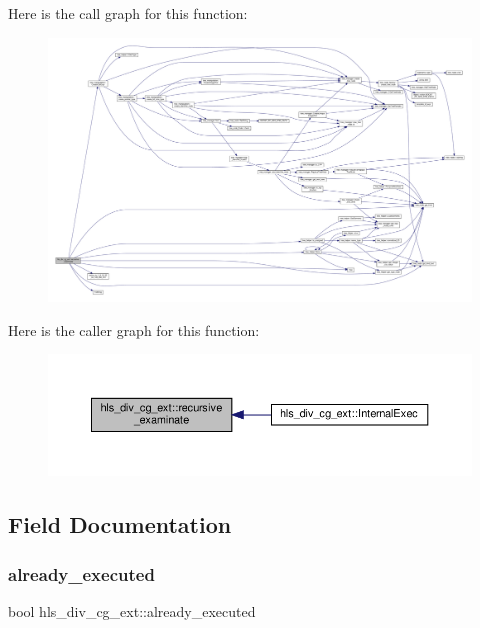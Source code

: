 Here is the call graph for this function\+:
\nopagebreak
\begin{figure}[H]
\begin{center}
\leavevmode
\includegraphics[width=350pt]{de/d52/classhls__div__cg__ext_a9c9f6aebf0e63e7997a0258bfc98213a_cgraph}
\end{center}
\end{figure}
Here is the caller graph for this function\+:
\nopagebreak
\begin{figure}[H]
\begin{center}
\leavevmode
\includegraphics[width=350pt]{de/d52/classhls__div__cg__ext_a9c9f6aebf0e63e7997a0258bfc98213a_icgraph}
\end{center}
\end{figure}


\subsection{Field Documentation}
\mbox{\label{classhls__div__cg__ext_aed46d7fb813f564018018ead742012fd}} 
\subsubsection{\texorpdfstring{already\+\_\+executed}{already\_executed}}
{\footnotesize\ttfamily bool hls\+\_\+div\+\_\+cg\+\_\+ext\+::already\+\_\+executed\hspace{0.3cm}{\ttfamily [protected]}}



